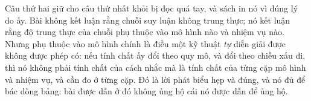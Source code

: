 %
Câu thứ hai giữ cho câu thứ nhất khỏi bị đọc quá tay, và sách in nó vì đúng lý do
ấy. Bài không kết luận rằng chuỗi suy luận không trung thực; nó kết luận rằng độ
trung thực của chuỗi phụ thuộc vào mô hình nào và nhiệm vụ nào. Nhưng phụ thuộc
vào mô hình chính là điều một kỹ thuật \emph{tự} diễn giải được không được phép
có: nếu tính chất ấy đổi theo quy mô, và đổi theo chiều xấu đi, thì nó không phải
tính chất của cách nhắc mà là tính chất của từng cặp mô hình và nhiệm vụ, và cần
đo ở từng cặp. Đó là lời phát biểu hẹp và đúng, và nó đủ để bác dòng bảng: bài
được dẫn ở đó không ủng hộ cái nó được dẫn để ủng hộ.
